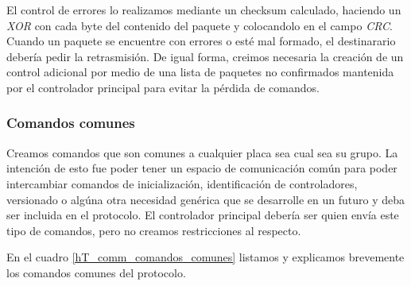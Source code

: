 El control de errores lo realizamos mediante un checksum calculado, haciendo un \emph{XOR} con cada byte del contenido del paquete
y colocandolo en el campo \emph{CRC}.
Cuando un paquete se encuentre con errores o est\'e mal formado, el destinarario deber\'ia pedir la retrasmisi\'on.
De igual forma, creimos necesaria la creaci\'on de un control adicional por medio de una lista de paquetes no confirmados mantenida
por el controlador principal para evitar la p\'erdida de comandos.

\subsubsection{Comandos comunes}
\label{h_comm_protocolo_comandosComunes}

Creamos comandos que son comunes a cualquier placa sea cual sea su grupo.
La intenci\'on de esto fue poder tener un espacio de comunicaci\'on com\'un para poder intercambiar comandos
de inicializaci\'on, identificaci\'on de controladores, versionado o alg\'una otra necesidad gen\'erica que
se desarrolle en un futuro y deba ser incluida en el protocolo.
El controlador principal deber\'ia ser quien env\'ia este tipo de comandos, pero no creamos restricciones al respecto.

En el cuadro \ref{hT_comm_comandos_comunes} listamos y explicamos brevemente los comandos comunes del protocolo.

